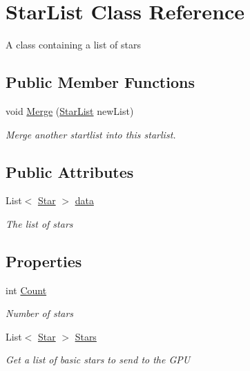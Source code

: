\hypertarget{class_star_list}{}\section{Star\+List Class Reference}
\label{class_star_list}


A class containing a list of stars  


\subsection*{Public Member Functions}
\begin{DoxyCompactItemize}
\item 
void \mbox{\hyperlink{class_star_list_a7c9063960137e10d9e3cf15deff1bf93}{Merge}} (\mbox{\hyperlink{class_star_list}{Star\+List}} new\+List)
\begin{DoxyCompactList}\small\item\em Merge another startlist into this starlist. \end{DoxyCompactList}\end{DoxyCompactItemize}
\subsection*{Public Attributes}
\begin{DoxyCompactItemize}
\item 
List$<$ \mbox{\hyperlink{struct_star}{Star}} $>$ \mbox{\hyperlink{class_star_list_a90e9208e7ae266d049ff3868ba9d3784}{data}}
\begin{DoxyCompactList}\small\item\em The list of stars \end{DoxyCompactList}\end{DoxyCompactItemize}
\subsection*{Properties}
\begin{DoxyCompactItemize}
\item 
int \mbox{\hyperlink{class_star_list_a7a0efcbd12035c8047769241830f6c63}{Count}}
\begin{DoxyCompactList}\small\item\em Number of stars \end{DoxyCompactList}\item 
List$<$ \mbox{\hyperlink{struct_star}{Star}} $>$ \mbox{\hyperlink{class_star_list_ad2117c98c982f9af21b0c40e89ccce4d}{Stars}}
\begin{DoxyCompactList}\small\item\em Get a list of basic stars to send to the G\+PU \end{DoxyCompactList}\end{DoxyCompactItemize}


